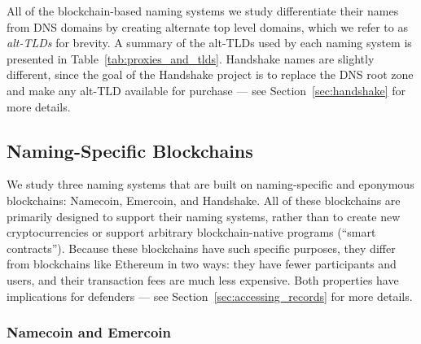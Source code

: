 All of the blockchain-based naming systems we study differentiate their names 
from DNS domains by creating alternate top level domains, 
which we refer to as \emph{alt-TLDs} for brevity. A 
summary of the alt-TLDs used by each naming system is presented in 
Table~\ref{tab:proxies_and_tlds}. Handshake names are slightly different, since 
the goal of the Handshake project is to replace the DNS root zone and make any 
alt-TLD available for purchase --- see Section~\ref{sec:handshake} for more 
details.


\subsection{Naming-Specific Blockchains}

We study three naming systems that are built on 
naming-specific and eponymous blockchains: 
Namecoin, Emercoin, and Handshake. All of these blockchains 
are primarily designed to support their naming systems,  
rather than to create new cryptocurrencies or support arbitrary 
blockchain-native programs (``smart contracts''). Because 
these 
blockchains have such specific purposes, they differ 
from blockchains like Ethereum in two ways: they have fewer 
participants and users, and their transaction fees are much 
less expensive. Both properties have implications for 
defenders --- see Section~\ref{sec:accessing_records} 
for more details. 

\subsubsection{Namecoin and Emercoin}

